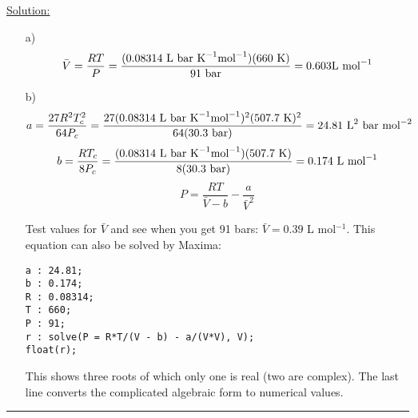 \noindent
\underline{Solution:}\\

\begin{itemize}

\item[a)] $$\bar{V} = \frac{RT}{P} = \frac{(0.08314\textnormal{ L bar K}^{-1}\textnormal{mol}^{-1})(660\textnormal{ K})}{91\textnormal{ bar}} = 0.603\textnormal{L mol}^{-1}$$

\item[b)] $$a = \frac{27R^2T_c^2}{64P_c} = \frac{27(0.08314\textnormal{ L bar K}^{-1}\textnormal{mol}^{-1})^2(507.7\textnormal{ K})^2}{64(30.3\textnormal{ bar})} = 24.81\textnormal{ L}^2\textnormal{ bar mol}^{-2}$$
$$b = \frac{RT_c}{8P_c} = \frac{(0.08314\textnormal{ L bar K}^{-1}\textnormal{mol}^{-1})(507.7\textnormal{ K})}{8(30.3\textnormal{ bar})} = 0.174\textnormal{ L mol}^{-1}$$
$$P = \frac{RT}{\bar{V} - b} - \frac{a}{\bar{V}^2}$$

Test values for $\bar{V}$ and see when you get 91 bars: $\bar{V} = 0.39$ L mol$^{-1}$. This equation can also be solved by Maxima:

\begin{verbatim}
a : 24.81;
b : 0.174;
R : 0.08314;
T : 660;
P : 91;
r : solve(P = R*T/(V - b) - a/(V*V), V);
float(r);
\end{verbatim}

This shows three roots of which only one is real (two are complex). The last line converts the complicated algebraic form to numerical values.

\end{itemize}

\hrule\vspace{0.5cm}
